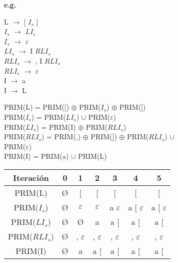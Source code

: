 \documentclass[\main/ApuntesPL.tex]{subfiles}
\begin{document}
      \bigskip
      \par
      \textbf{e.g.}
      \begin{center}
        \begin{minipage}{.3\textwidth}
          \hspace*{5mm}L $\rightarrow$ [ $I_s$ ]\\
          \hspace*{5mm}$I_s$ $\rightarrow$ $LI_s$ \\
          \hspace*{5mm}$I_s$ $\rightarrow$ $\varepsilon$\\
          \hspace*{5mm}$LI_s$ $\rightarrow$ I $RLI_s$ \\
          \hspace*{5mm}$RLI_s$ $\rightarrow$ , I $RLI_s$ \\
          \hspace*{5mm}$RLI_s$ $\rightarrow$ $\varepsilon$\\
          \hspace*{5mm}I $\rightarrow$ a\\
          \hspace*{5mm}I $\rightarrow$ L\\
        \end{minipage}%
        \begin{minipage}{.7\textwidth}
          PRIM(L) = PRIM([) $\oplus$ PRIM($I_s$) $\oplus$ PRIM(])\\
          PRIM($I_s$) = PRIM($LI_s$) $\cup$ PRIM($\varepsilon$)\\
          PRIM($LI_s$) = PRIM(I) $\oplus$ PRIM($RLI_s$)\\
          PRIM($RLI_s$) = PRIM(,) $\oplus$ PRIM(]) $\oplus$ PRIM($RLI_s$) $\cup$\\
          \hspace*{28mm}PRIM($\varepsilon$)\\
          PRIM(I) = PRIM(a) $\cup$ PRIM(L)\\
          \vspace*{2mm}

          \begin{tabular}{||c c c c c c c||}
            \hline
            Iteración & 0 & 1 & 2 & 3 & 4 & 5 \\ [0.5ex]
            \hline\hline
            PRIM(L) & \O & [ & [ & [ & [ & [ \\
            \hline
            PRIM($I_s$) & \O & $\varepsilon$ & $\varepsilon$ & a $\varepsilon$ & a [ $\varepsilon$
              & a [ $\varepsilon$ \\
            \hline
            PRIM($LI_s$) & \O & \O & a & a [ & a [ & a [ \\
            \hline
            PRIM($RLI_s$) & \O & , $\varepsilon$ & , $\varepsilon$ & , $\varepsilon$ & , $\varepsilon$
              & , $\varepsilon$ \\
            \hline
            PRIM(I) & \O & a & a [ & a [ & a [ & a [ \\ [1ex]
            \hline
          \end{tabular}
        \end{minipage}
      \end{center}
\end{document}
